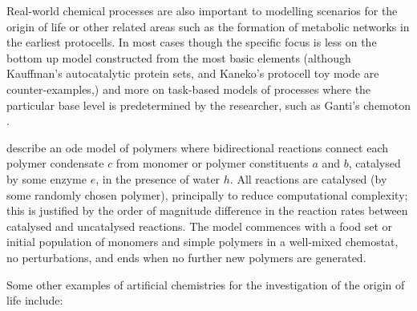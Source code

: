Real-world chemical processes are also important to modelling scenarios for the origin of life or other related areas such as the formation of metabolic networks in the earliest protocells. In most cases though the specific focus is less on the bottom up model constructed from the most basic elements (although Kauffman's autocatalytic protein sets, and Kaneko's protocell toy mode are counter-examples,) and more on task-based models of processes where the particular base level is predetermined by the researcher, such as Ganti's chemoton \parencite{Ganti:2003hl}.

\Textcite{Farmer1986} describe an \gls{ode} model of polymers where bidirectional reactions connect each polymer condensate $c$ from monomer or polymer constituents $a$ and $b$, catalysed by some enzyme $e$, in the presence of water $h$. All reactions are catalysed (by some randomly chosen polymer), principally to reduce computational complexity; this is justified by the order of magnitude difference in the reaction rates between catalysed and uncatalysed reactions.  The model commences with a food set or initial population of monomers and simple polymers in a well-mixed chemostat, no perturbations, and ends when no further new polymers are generated.

Some other examples of artificial chemistries for the investigation of the origin of life include:

